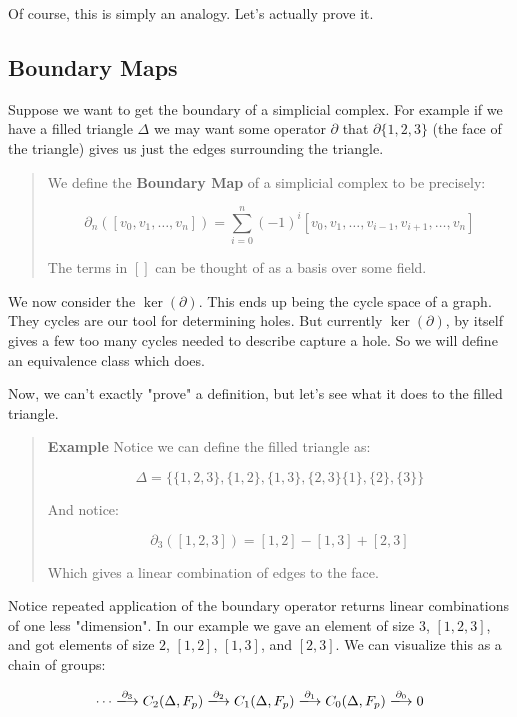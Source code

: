 \documentclass[letterpaper,12pt]{article}
\newcommand{\xlra}{\xlongrightarrow}
\begin{document}
Of course, this is simply an analogy. Let's actually prove it.

\subsection{Boundary Maps}

Suppose we want to get the boundary of a simplicial complex. For example if we have a filled triangle $\Delta$ we may want some operator $\partial$ that $\partial \{1, 2, 3 \}$ (the face of the triangle) gives us just the edges surrounding the triangle.

\begin{quote}
    We define the \textbf{Boundary Map} of a simplicial complex to be precisely:
    
    $$\partial_n([v_0,v_1,\ldots,v_n]) = \sum_{i=0}^n (-1)^i[v_0,v_1,\ldots,v_{i-1},v_{i+1},\ldots,v_n ]$$

    The terms in $[]$ can be thought of as a basis over some field.
\end{quote}

We now consider the $\ker(\partial)$. This ends up being the cycle space of a graph. They cycles are our tool for determining holes. But currently $\ker(\partial)$, by itself gives a few too many cycles needed to describe capture a hole. So we will define an equivalence class which does.

Now, we can't exactly "prove" a definition, but let's see what it does to the filled triangle.

\begin{quote}
    \textbf{Example} Notice we can define the filled triangle as:

    $$\Delta = \{ \{ 1, 2, 3 \}, \{ 1, 2 \}, \{ 1, 3 \}, \{ 2, 3 \} \{ 1 \}, \{ 2 \}, \{ 3 \} \}$$

    And notice:

    $$\partial_3([1,2,3]) = [1, 2] - [1, 3] + [2, 3]$$

    Which gives a linear combination of edges to the face.
\end{quote}

Notice repeated application of the boundary operator returns linear combinations of one less "dimension". In our example we gave an element of size $3$, $[1,2,3]$, and got elements of size $2$, $[1,2]$, $[1,3]$, and $[2,3]$. We can visualize this as a chain of groups:

$$ \cdots \xlra{\partial_3} C_2(\Delta, F_p) \xlra{\partial_2} C_1(\Delta, F_p) \xlra{\partial_1} C_0(\Delta, F_p) \xlra{\partial_0} 0 $$
\end{document}
